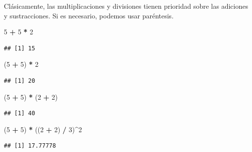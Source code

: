 \documentclass[
]{book}
\newenvironment{Shaded}{\begin{snugshade}}{\end{snugshade}}
\newcommand{\DecValTok}[1]{\textcolor[rgb]{0.00,0.00,0.81}{#1}}
\newcommand{\NormalTok}[1]{#1}
\newcommand{\OperatorTok}[1]{\textcolor[rgb]{0.81,0.36,0.00}{\textbf{#1}}}
\newcommand{\StringTok}[1]{\textcolor[rgb]{0.31,0.60,0.02}{#1}}
\begin{document}
Clásicamente, las multiplicaciones y divisiones tienen prioridad sobre las adiciones y sustracciones. Si es necesario, podemos usar paréntesis.

\begin{Shaded}
\begin{Highlighting}[]
\DecValTok{5} \OperatorTok{+}\StringTok{ }\DecValTok{5} \OperatorTok{*}\StringTok{ }\DecValTok{2}
\end{Highlighting}
\end{Shaded}

\begin{verbatim}
## [1] 15
\end{verbatim}

\begin{Shaded}
\begin{Highlighting}[]
\NormalTok{(}\DecValTok{5} \OperatorTok{+}\StringTok{ }\DecValTok{5}\NormalTok{) }\OperatorTok{*}\StringTok{ }\DecValTok{2}
\end{Highlighting}
\end{Shaded}

\begin{verbatim}
## [1] 20
\end{verbatim}

\begin{Shaded}
\begin{Highlighting}[]
\NormalTok{(}\DecValTok{5} \OperatorTok{+}\StringTok{ }\DecValTok{5}\NormalTok{) }\OperatorTok{*}\StringTok{ }\NormalTok{(}\DecValTok{2} \OperatorTok{+}\StringTok{ }\DecValTok{2}\NormalTok{)}
\end{Highlighting}
\end{Shaded}

\begin{verbatim}
## [1] 40
\end{verbatim}

\begin{Shaded}
\begin{Highlighting}[]
\NormalTok{(}\DecValTok{5} \OperatorTok{+}\StringTok{ }\DecValTok{5}\NormalTok{) }\OperatorTok{*}\StringTok{ }\NormalTok{((}\DecValTok{2} \OperatorTok{+}\StringTok{ }\DecValTok{2}\NormalTok{) }\OperatorTok{/}\StringTok{ }\DecValTok{3}\NormalTok{)}\OperatorTok{^}\DecValTok{2}
\end{Highlighting}
\end{Shaded}

\begin{verbatim}
## [1] 17.77778
\end{verbatim}
\end{document}
